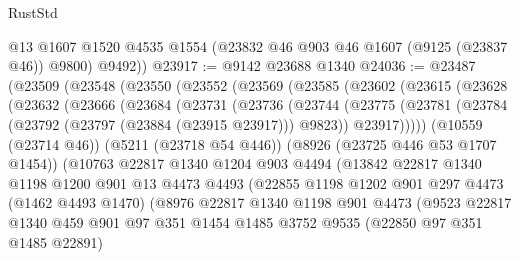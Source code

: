 \begin{lexlean}{RustStd}
\begin{coremodule}
        @13
        @1607
        @1520
        @4535
        @1554
        (@23832 @46 @903 @46 @1607 (@9125 (@23837 @46)) @9800)
        @9492))
@23917 := @9142 @23688 @1340
@24036 := @23487
    (@23509
      (@23548
        (@23550
          (@23552
            (@23569
              (@23585
                (@23602
                  (@23615
                    (@23628
                      (@23632
                        (@23666
                          (@23684
                            (@23731
                              (@23736
                                (@23744
                                  (@23775
                                    (@23781
                                      (@23784 (@23792 (@23797 (@23884 (@23915 @23917))) @9823))
                                      @23917)))))
                            (@10559 (@23714 @46))
                            (@5211 (@23718 @54 @446))
                            (@8926 (@23725 @446 @53 @1707 @1454))
                            (@10763
                              @22817
                              @1340
                              @1204
                              @903
                              @4494
                              (@13842
                                @22817
                                @1340
                                @1198
                                @1200
                                @901
                                @13
                                @4473
                                @4493
                                (@22855
                                  @1198
                                  @1202
                                  @901
                                  @297
                                  @4473
                                  (@1462 @4493 @1470)
                                  (@8976
                                    @22817
                                    @1340
                                    @1198
                                    @901
                                    @4473
                                    (@9523
                                      @22817
                                      @1340
                                      @459
                                      @901
                                      @97
                                      @351
                                      @1454
                                      @1485
                                      @3752
                                      @9535
                                      (@22850 @97 @351 @1485 @22891)

\end{coremodule}
\end{lexlean}
